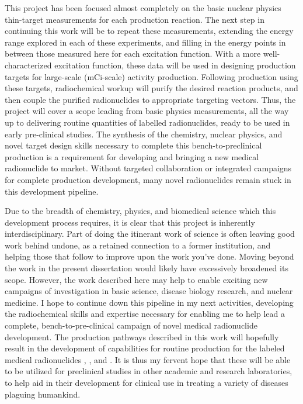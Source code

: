 This project has been focused almost completely on  the basic nuclear physics thin-target measurements for each production reaction.
The next step in continuing this work will be to repeat these measurements, extending the energy range explored in each of these experiments, and filling in the energy points in between those measured here for each excitation function. 
With a more well-characterized excitation function, these data  will be used in designing production targets for large-scale (mCi-scale) activity production. 
Following production using these targets, radiochemical workup will purify the desired reaction products, and then couple the purified radionuclides to appropriate targeting vectors. 
Thus, the project will cover a scope leading from basic physics measurements, all the way up to delivering routine quantities of labelled radionuclides, ready to be used in early pre-clinical studies. 
The synthesis of the chemistry, nuclear physics, and novel target design skills necessary to complete this bench-to-preclinical production is a requirement for developing and bringing a new medical radionuclide to market.
Without targeted collaboration or integrated campaigns for complete production development, many novel radionuclides remain stuck in this development pipeline.



Due to the breadth of chemistry, physics, and biomedical science which this development process requires, it is clear that this project is inherently interdisciplinary.
Part of doing the itinerant work of science is often leaving good work behind undone, as a retained connection to a former institution, and helping those that follow  to improve upon the work you've done. 
Moving beyond the  work in the present dissertation would likely have excessively broadened its scope.
However, the work described here may help to enable exciting new campaigns of investigation in basic science, disease biology research, and nuclear medicine.
I hope to continue down this pipeline in my next activities, developing the radiochemical skills and expertise necessary for enabling me to help lead a complete, bench-to-pre-clinical campaign of novel medical radionuclide development.
The production pathways described in this work  will hopefully result in the development of capabilities for routine production for the labeled medical radionuclides  ,   , and . 
It is thus my fervent hope that these will be able to be utilized for preclinical studies in other  academic and research laboratories, to help aid in their development for clinical use in treating a variety of diseases plaguing humankind. 



